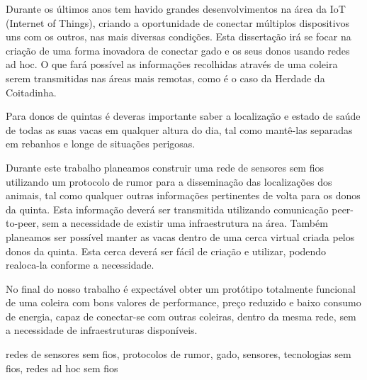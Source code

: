 
%

Durante os últimos anos tem havido grandes desenvolvimentos na área da IoT (Internet of Things),
criando a oportunidade de conectar múltiplos dispositivos uns com os outros, nas mais
diversas condições. Esta dissertação irá se focar na criação de uma forma inovadora de
conectar gado e os seus donos usando redes ad hoc. O que fará possível as informações
recolhidas através de uma coleira serem transmitidas nas áreas mais remotas, como é o caso da
Herdade da Coitadinha.

Para donos de quintas é deveras importante saber a localização e estado de saúde de todas as
suas vacas em qualquer altura do dia, tal como mantê-las separadas em rebanhos e longe de
situações perigosas.

Durante este trabalho planeamos construir uma rede de sensores sem fios utilizando um protocolo
de rumor para a disseminação das localizações dos animais, tal como qualquer outras informações
pertinentes de volta para os donos da quinta. Esta informação deverá ser transmitida utilizando
comunicação peer-to-peer, sem a necessidade de existir uma infraestrutura na área. Também planeamos
ser possível manter as vacas dentro de uma cerca virtual criada pelos donos da quinta. Esta cerca
deverá ser fácil de criação e utilizar, podendo realoca-la conforme a necessidade.

No final do nosso trabalho é expectável obter um protótipo totalmente funcional de uma coleira
com bons valores de performance, preço reduzido e baixo consumo de energia, capaz de conectar-se
com outras coleiras, dentro da mesma rede, sem a necessidade de infraestruturas disponíveis.

\begin{keywords}
    redes de sensores sem fios, protocolos de rumor, gado, sensores, tecnologias sem fios, redes ad hoc sem fios
\end{keywords}